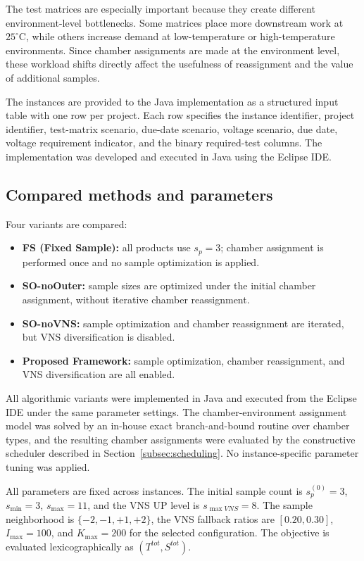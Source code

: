 \documentclass[11pt]{article}
\begin{document}
The test matrices are especially important because they create different environment-level bottlenecks. Some matrices place more downstream work at \(25^\circ\mathrm{C}\), while others increase demand at low-temperature or high-temperature environments. Since chamber assignments are made at the environment level, these workload shifts directly affect the usefulness of reassignment and the value of additional samples.

The instances are provided to the Java implementation as a structured input table with one row per project. Each row specifies the instance identifier, project identifier, test-matrix scenario, due-date scenario, voltage scenario, due date, voltage requirement indicator, and the binary required-test columns. The implementation was developed and executed in Java using the Eclipse IDE.

\subsection{Compared methods and parameters}
\label{subsec:methods_params}

Four variants are compared:
\begin{itemize}
    \item \textbf{FS (Fixed Sample):} all products use \(s_p=3\); chamber assignment is performed once and no sample optimization is applied.
    \item \textbf{SO-noOuter:} sample sizes are optimized under the initial chamber assignment, without iterative chamber reassignment.
    \item \textbf{SO-noVNS:} sample optimization and chamber reassignment are iterated, but VNS diversification is disabled.
    \item \textbf{Proposed Framework:} sample optimization, chamber reassignment, and VNS diversification are all enabled.
\end{itemize}

All algorithmic variants were implemented in Java and executed from the Eclipse IDE under the same parameter settings. The chamber-environment assignment model was solved by an in-house exact branch-and-bound routine over chamber types, and the resulting chamber assignments were evaluated by the constructive scheduler described in Section~\ref{subsec:scheduling}. No instance-specific parameter tuning was applied.

All parameters are fixed across instances. The initial sample count is \(s_p^{(0)}=3\), \(s_{\min}=3\), \(s_{\max}=11\), and the VNS \textsc{UP} level is \(s_{\max VNS}=8\). The sample neighborhood is \(\{-2,-1,+1,+2\}\), the VNS fallback ratios are \([0.20,0.30]\), \(I_{\max}=100\), and \(K_{\max}=200\) for the selected configuration. The objective is evaluated lexicographically as \((T^{tot},S^{tot})\).
\end{document}
